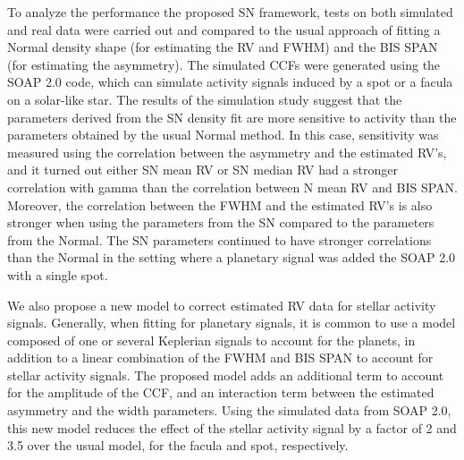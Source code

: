 \documentclass{aa}
\begin{document}
To analyze the performance the proposed SN framework, tests on both simulated and real data were carried out and compared to the usual approach of fitting a Normal density shape (for estimating the RV and FWHM) and the BIS SPAN (for estimating the asymmetry).
The simulated CCFs were generated using the SOAP 2.0 code, which can simulate activity signals induced by a spot or a facula on a solar-like star. The results of the simulation study suggest that the parameters derived from the SN density fit are more sensitive to activity than the parameters obtained by the usual Normal method. 
In this case, sensitivity was measured using the correlation between the asymmetry and the estimated RV's, and it turned out either SN mean RV or SN median RV had a stronger correlation with gamma than the correlation between N mean RV and BIS SPAN. 
Moreover, the correlation between the FWHM and the estimated RV's is also stronger when using the parameters from the SN compared to the parameters from the Normal. 
The SN parameters continued to have stronger correlations than the Normal in the setting where a planetary signal was added the SOAP 2.0 with a single spot.

We also propose a new model to correct estimated RV data for stellar activity signals. 
Generally, when fitting for planetary signals, it is common to use a model composed of one or several Keplerian signals to account for the planets, in addition to a linear combination of the FWHM and BIS SPAN to account for stellar activity signals. 
The proposed model adds an additional term to account for the amplitude of the CCF, and an interaction term between the estimated asymmetry and the width parameters. 
Using the simulated data from SOAP 2.0, this new model reduces the effect of the stellar activity signal by a factor of 2 and 3.5 over the usual model, for the facula and spot, respectively.
\end{document}
